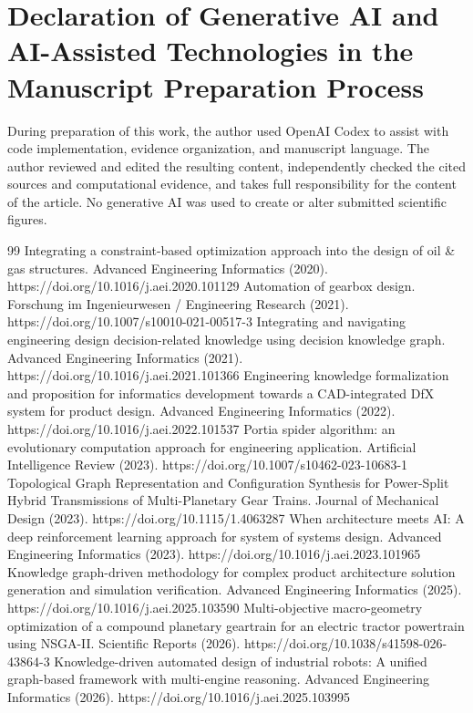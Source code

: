 \documentclass[preprint,12pt]{elsarticle}
\begin{document}
\section{Declaration of Generative AI and AI-Assisted Technologies in the Manuscript Preparation Process}
During preparation of this work, the author used OpenAI Codex to assist with code implementation, evidence organization, and manuscript language. The author reviewed and edited the resulting content, independently checked the cited sources and computational evidence, and takes full responsibility for the content of the article. No generative AI was used to create or alter submitted scientific figures.

\begin{thebibliography}{99}
Integrating a constraint-based optimization approach into the design of oil \& gas structures. Advanced Engineering Informatics (2020). https://doi.org/10.1016/j.aei.2020.101129
Automation of gearbox design. Forschung im Ingenieurwesen / Engineering Research (2021). https://doi.org/10.1007/s10010-021-00517-3
Integrating and navigating engineering design decision-related knowledge using decision knowledge graph. Advanced Engineering Informatics (2021). https://doi.org/10.1016/j.aei.2021.101366
Engineering knowledge formalization and proposition for informatics development towards a CAD-integrated DfX system for product design. Advanced Engineering Informatics (2022). https://doi.org/10.1016/j.aei.2022.101537
Portia spider algorithm: an evolutionary computation approach for engineering application. Artificial Intelligence Review (2023). https://doi.org/10.1007/s10462-023-10683-1
Topological Graph Representation and Configuration Synthesis for Power-Split Hybrid Transmissions of Multi-Planetary Gear Trains. Journal of Mechanical Design (2023). https://doi.org/10.1115/1.4063287
When architecture meets AI: A deep reinforcement learning approach for system of systems design. Advanced Engineering Informatics (2023). https://doi.org/10.1016/j.aei.2023.101965
Knowledge graph-driven methodology for complex product architecture solution generation and simulation verification. Advanced Engineering Informatics (2025). https://doi.org/10.1016/j.aei.2025.103590
Multi-objective macro-geometry optimization of a compound planetary geartrain for an electric tractor powertrain using NSGA-II. Scientific Reports (2026). https://doi.org/10.1038/s41598-026-43864-3
Knowledge-driven automated design of industrial robots: A unified graph-based framework with multi-engine reasoning. Advanced Engineering Informatics (2026). https://doi.org/10.1016/j.aei.2025.103995
\end{thebibliography}
\end{document}
